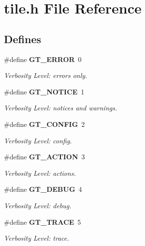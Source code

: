 \section{tile.h File Reference}
\label{tile_8h}
\subsection*{Defines}
\begin{CompactItemize}
\item 
\#define {\bf GT\_\-ERROR}~0
\begin{CompactList}\small\item\em Verbosity Level: errors only. \item\end{CompactList}\item 
\#define {\bf GT\_\-NOTICE}~1
\begin{CompactList}\small\item\em Verbosity Level: notices and warnings. \item\end{CompactList}\item 
\#define {\bf GT\_\-CONFIG}~2
\begin{CompactList}\small\item\em Verbosity Level: config. \item\end{CompactList}\item 
\#define {\bf GT\_\-ACTION}~3
\begin{CompactList}\small\item\em Verbosity Level: actions. \item\end{CompactList}\item 
\#define {\bf GT\_\-DEBUG}~4
\begin{CompactList}\small\item\em Verbosity Level: debug. \item\end{CompactList}\item 
\#define {\bf GT\_\-TRACE}~5
\begin{CompactList}\small\item\em Verbosity Level: trace. \item\end{CompactList}\end{CompactItemize}
